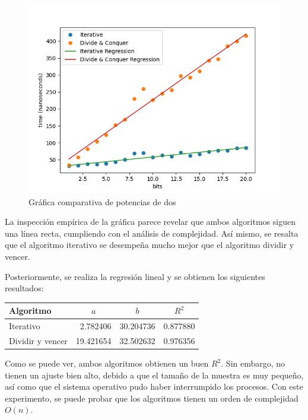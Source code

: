 \documentclass[letter]{article}
\begin{document}
\begin{figure}[!ht]
    \centering
    \includegraphics[scale=0.5]{img/plot.png}
    \vspace{-1em}
    \caption{Gráfica comparativa de potencias de dos}
    \label{fig:plot}
\end{figure}

La inspección empírica de la gráfica parece revelar que ambos algoritmos siguen una línea recta, cumpliendo con el análisis de complejidad. Así mismo, se resalta que el algoritmo iterativo se desempeña mucho mejor que el algoritmo dividir y vencer. \par

Posteriormente, se realiza la regresión lineal y se obtienen los siguientes resultados: \par

\begin{table}[ht!]
\centering
\begin{tabular}{|l|r|r|r|}
\hline
Algoritmo        & \multicolumn{1}{c|}{$a$} & \multicolumn{1}{c|}{$b$} & \multicolumn{1}{c|}{$R^2$} \\ \hline
Iterativo        & 2.782406                 & 30.204736                & 0.877880                   \\ \hline
Dividir y vencer & 19.421654                & 32.502632                & 0.976356                   \\ \hline
\end{tabular}
\end{table}

Como se puede ver, ambos algoritmos obtienen un buen $R^2$. Sin embargo, no tienen un ajuste bien alto, debido a que el tamaño de la muestra es muy pequeño, así como que el sistema operativo pudo haber interrumpido los procesos. Con este experimento, se puede probar que los algoritmos tienen un orden de complejidad $O(n)$.
\end{document}
